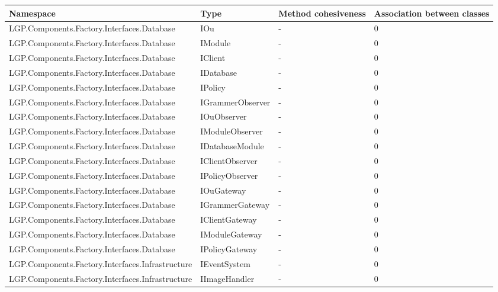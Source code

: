		\newpage
			
			\begin{table}[h!t]
				\footnotesize{\begin{tabular}{ | p{85mm} | p{35mm} | p{13mm} | p{14mm}  | }	
																						\hline
				Namespace & Type  & Method cohesiveness & Association between classes  \\ \hline
				LGP.Components.Factory.Interfaces.Database & IOu   & -     & 0  \\ \hline
				LGP.Components.Factory.Interfaces.Database & IModule & -     & 0  \\ \hline
				LGP.Components.Factory.Interfaces.Database & IClient & -     & 0  \\ \hline
				LGP.Components.Factory.Interfaces.Database & IDatabase & -     & 0  \\ \hline			
				LGP.Components.Factory.Interfaces.Database & IPolicy & -     & 0  \\ \hline
				LGP.Components.Factory.Interfaces.Database & IGrammerObserver & -     & 0  \\ \hline
				LGP.Components.Factory.Interfaces.Database & IOuObserver & -     & 0  \\ \hline
				LGP.Components.Factory.Interfaces.Database & IModuleObserver & -     & 0  \\ \hline
				LGP.Components.Factory.Interfaces.Database & IDatabaseModule & -     & 0  \\ \hline
				LGP.Components.Factory.Interfaces.Database & IClientObserver & -     & 0  \\ \hline
				LGP.Components.Factory.Interfaces.Database & IPolicyObserver & -     & 0  \\ \hline
				LGP.Components.Factory.Interfaces.Database & IOuGateway & -     & 0  \\ \hline
				LGP.Components.Factory.Interfaces.Database & IGrammerGateway & -     & 0  \\ \hline
				LGP.Components.Factory.Interfaces.Database & IClientGateway & -     & 0  \\ \hline
				LGP.Components.Factory.Interfaces.Database & IModuleGateway & -     & 0  \\ \hline
				LGP.Components.Factory.Interfaces.Database & IPolicyGateway & -     & 0  \\ \hline
				LGP.Components.Factory.Interfaces.Infrastructure & IEventSystem & -     & 0  \\ \hline
				LGP.Components.Factory.Interfaces.Infrastructure & IImageHandler & -     & 0  \\ \hline

\end{tabular}}
\end{table}
